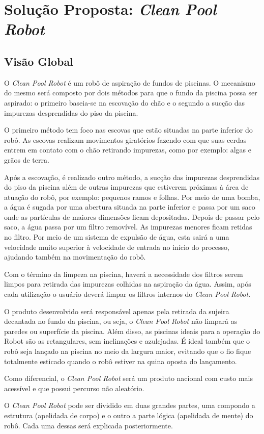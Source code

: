 \chapter{Solução Proposta: \textit{Clean Pool Robot}}
\section{Visão Global}
O \textit{Clean Pool Robot} é um robô de aspiração de fundos de piscinas. O
mecanismo do mesmo será composto por dois métodos para que o fundo da piscina
possa ser aspirado: o primeiro baseia-se na escovação do chão e o segundo a
sucção das impurezas desprendidas do piso da piscina.
\par
O primeiro método tem foco nas escovas que estão situadas na parte inferior
do robô. As escovas realizam movimentos giratórios fazendo com que suas cerdas
entrem em contato com o chão retirando  impurezas, como por exemplo: algas e
grãos de terra.
\par
Após a escovação, é realizado outro método, a sucção das impurezas desprendidas
do piso da piscina  além de outras impurezas que estiverem próximas à área de
atuação do robô, por exemplo: pequenos ramos e folhas. Por meio de uma bomba, a
água é sugada por uma abertura situada na parte inferior e passa por um saco onde
as partículas de maiores dimensões ficam depositadas. Depois de passar pelo saco,
a água passa por um filtro removível. As impurezas menores ficam retidas no filtro.
Por meio de um sistema de expulsão de água, esta sairá a uma velocidade muito superior
à velocidade de entrada no início do processo, ajudando também na movimentação do robô.
\par
Com o término da limpeza na piscina, haverá a necessidade dos filtros serem limpos
para retirada das impurezas colhidas na aspiração da água. Assim, após cada utilização
o usuário deverá limpar os filtros internos do \textit{Clean Pool Robot}.
\par
O produto desenvolvido será responsável apenas pela retirada da sujeira decantada
no fundo da piscina, ou seja, o \textit{Clean Pool Robot} não limpará as paredes
ou superfície da piscina. Além disso, as piscinas ideais para a operação do Robot
são as retangulares, sem inclinações e azulejadas. É ideal também que o robô seja
lançado na piscina no meio da largura maior, evitando que o fio fique totalmente
esticado quando o robô estiver na quina oposta do lançamento.
\par
Como diferencial, o \textit{Clean Pool Robot} será um produto nacional com custo
mais acessível e que possui percurso não aleatório.
\par
O \textit{Clean Pool Robot} pode ser dividido em duas grandes partes, uma compondo a
estrutura (apelidada de corpo) e o outro a parte lógica (apelidada de mente) do
robô. Cada uma dessas será explicada posteriormente.

